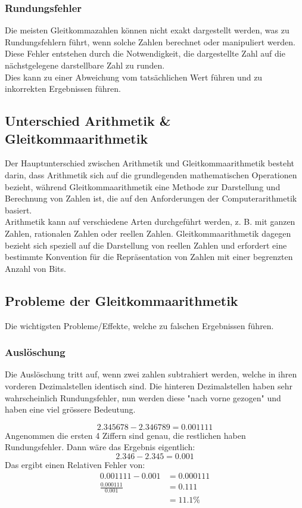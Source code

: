 \subsubsection{Rundungsfehler}
Die meisten Gleitkommazahlen können nicht exakt dargestellt werden, was zu Rundungsfehlern führt, wenn solche Zahlen berechnet oder manipuliert werden. Diese Fehler entstehen durch die Notwendigkeit, die dargestellte Zahl auf die nächstgelegene darstellbare Zahl zu runden. \\
Dies kann zu einer Abweichung vom tatsächlichen Wert führen und zu inkorrekten Ergebnissen führen.



\subsection{Unterschied Arithmetik \& Gleitkommaarithmetik}
Der Hauptunterschied zwischen Arithmetik und Gleitkommaarithmetik besteht darin, dass Arithmetik sich auf die grundlegenden mathematischen Operationen bezieht, während Gleitkommaarithmetik eine Methode zur Darstellung und Berechnung von Zahlen ist, die auf den Anforderungen der Computerarithmetik basiert.  \\
Arithmetik kann auf verschiedene Arten durchgeführt werden, z. B. mit ganzen Zahlen, rationalen Zahlen oder reellen Zahlen. Gleitkommaarithmetik dagegen bezieht sich speziell auf die Darstellung von reellen Zahlen und erfordert eine bestimmte Konvention für die Repräsentation von Zahlen mit einer begrenzten Anzahl von Bits.

\subsection{Probleme der Gleitkommaarithmetik}
Die wichtigsten Probleme/Effekte, welche zu falschen Ergebnissen führen.
\subsubsection{Auslöschung}
Die Auslöschung tritt auf, wenn zwei zahlen subtrahiert werden, welche in ihren vorderen Dezimalstellen identisch sind. Die hinteren Dezimalstellen haben sehr wahrscheinlich Rundungsfehler, nun werden diese "nach vorne gezogen" und haben eine viel grössere Bedeutung. \\
\begin{exmp}
	\begin{displaymath}
		2.345678 - 2.346789 = 0.001111
	\end{displaymath}
	Angenommen die ersten 4 Ziffern sind  genau, die restlichen haben Rundungsfehler. Dann wäre das Ergebnis eigentlich:
	\begin{displaymath}
		2.346-2.345=0.001
	\end{displaymath}
	Das ergibt einen Relativen Fehler von:
	\begin{align*}
		0.001111-0.001 &= 0.000111 \\
		\frac{0.000111}{0.001} &= 0.111 \\
		&= 11.1\%
	\end{align*}
\end{exmp}

